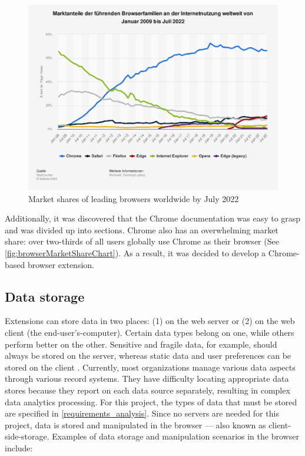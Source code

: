 \begin{figure}[ht!]
  \includegraphics[width=\textwidth]{assets/statistic_id157944_marktanteile-fuehrender-browser-weltweit-bis-juli-2022.png}
  \caption{Market shares of leading browsers worldwide by July 2022}
  \label{fig:browserMarketShareChart}
\end{figure}

Additionally, it was discovered that the Chrome documentation was easy to grasp and was divided up into sections. Chrome also has an overwhelming market share: over two-thirds of all users globally use Chrome as their browser (See \autoref{fig:browserMarketShareChart}). As a result, it was decided to develop a Chrome-based browser extension.

\subsection{Data storage}
Extensions can store data in two places: (1) on the web server or (2) on the web client (the end-user's-computer). Certain data types belong on one, while others perform better on the other. Sensitive and fragile data, for example, should always be stored on the server, whereas static data and user preferences can be stored on the client \autocite{macdonald2013html5}. Currently, most organizations manage various data aspects through various record systems. They have difficulty locating appropriate data stores because they report on each data source separately, resulting in complex data analytics processing. For this project, the types of data that must be stored are specified in \autoref{requirements_analysis}. Since no servers are needed for this project, data is stored and manipulated in the browser --- also known as client-side-storage. Examples of data storage and manipulation scenarios in the browser include:

